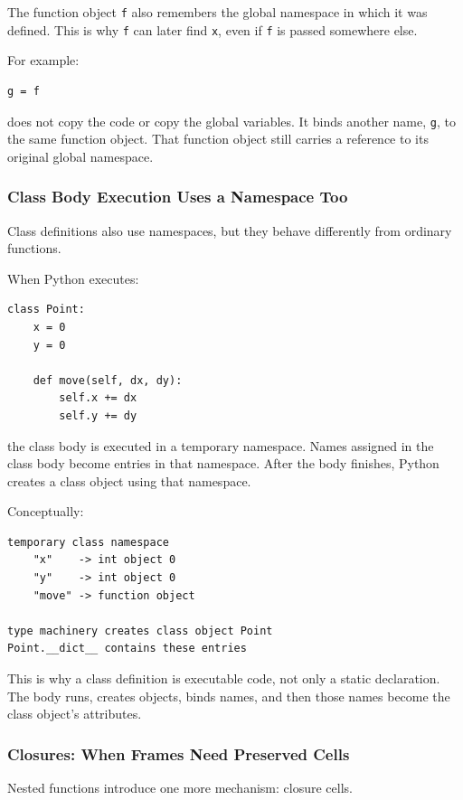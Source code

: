 The function object \texttt{f} also remembers the global namespace in which it was defined. This is why \texttt{f} can later find \texttt{x}, even if \texttt{f} is passed somewhere else.

For example:

\begin{verbatim}
g = f
\end{verbatim}

does not copy the code or copy the global variables. It binds another name, \texttt{g}, to the same function object. That function object still carries a reference to its original global namespace.

\subsubsection{Class Body Execution Uses a Namespace Too}

Class definitions also use namespaces, but they behave differently from ordinary functions.

When Python executes:

\begin{verbatim}
class Point:
    x = 0
    y = 0

    def move(self, dx, dy):
        self.x += dx
        self.y += dy
\end{verbatim}

the class body is executed in a temporary namespace. Names assigned in the class body become entries in that namespace. After the body finishes, Python creates a class object using that namespace.

Conceptually:

\begin{verbatim}
temporary class namespace
    "x"    -> int object 0
    "y"    -> int object 0
    "move" -> function object

type machinery creates class object Point
Point.__dict__ contains these entries
\end{verbatim}

This is why a class definition is executable code, not only a static declaration. The body runs, creates objects, binds names, and then those names become the class object's attributes.

\subsubsection{Closures: When Frames Need Preserved Cells}

Nested functions introduce one more mechanism: closure cells.

